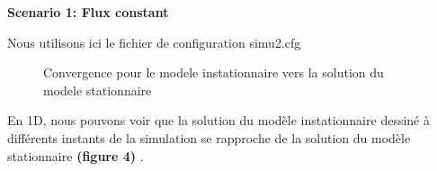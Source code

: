 \documentclass[11pt]{article} %
\begin{document}
			
			\begin{center}
				\textbf{Scenario 1: Flux constant}
			\end{center}
\par Nous utilisons ici le fichier de configuration simu\textunderscore2.cfg
			\begin{figure}[!htb]
				\centering
				\qquad
				\caption{Convergence pour le modele instationnaire vers la solution du modele stationnaire}%
				\label{fig:conv_instat}%
			\end{figure}
\par En 1D, nous pouvons voir que la solution du modèle instationnaire dessiné à différents instants de la simulation se rapproche de la solution du modèle stationnaire \textbf{(figure 4)} .
\end{document}
